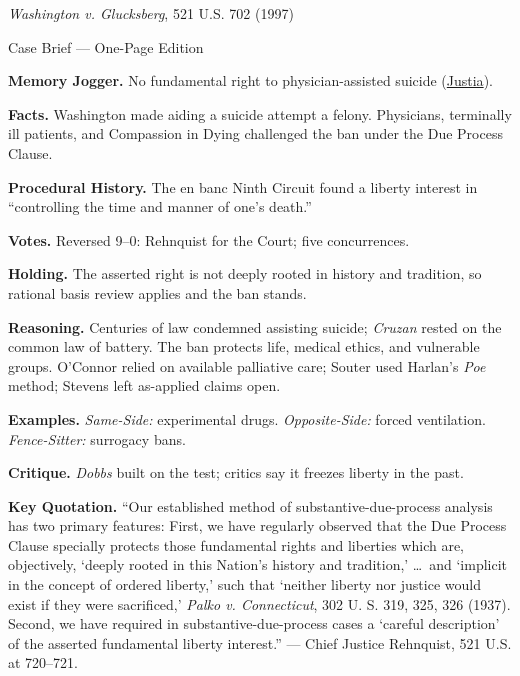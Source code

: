 \documentclass[12pt]{article}
\begin{document}
\begin{center}
{\Large \textit{Washington v. Glucksberg}, 521 U.S. 702 (1997)\par}
\vspace{0.3em}
{\normalsize Case Brief --- One-Page Edition\par}
\end{center}

\textbf{Memory Jogger.} No fundamental right to physician-assisted suicide (\href{https://supreme.justia.com/cases/federal/us/521/702/}{Justia}).

\textbf{Facts.} Washington made aiding a suicide attempt a felony. Physicians, terminally ill patients, and Compassion in Dying challenged the ban under the Due Process Clause.

\textbf{Procedural History.} The en banc Ninth Circuit found a liberty interest in ``controlling the time and manner of one's death.''

\textbf{Votes.} Reversed 9--0: Rehnquist for the Court; five concurrences.

\textbf{Holding.} The asserted right is not deeply rooted in history and tradition, so rational basis review applies and the ban stands.

\textbf{Reasoning.} Centuries of law condemned assisting suicide; \textit{Cruzan} rested on the common law of battery. The ban protects life, medical ethics, and vulnerable groups. O'Connor relied on available palliative care; Souter used Harlan's \textit{Poe} method; Stevens left as-applied claims open.

\textbf{Examples.} \emph{Same-Side:} experimental drugs. \emph{Opposite-Side:} forced ventilation. \emph{Fence-Sitter:} surrogacy bans.

\textbf{Critique.} \textit{Dobbs} built on the test; critics say it freezes liberty in the past.

\textbf{Key Quotation.} ``Our established method of substantive-due-process analysis has two primary features: First, we have regularly observed that the Due Process Clause specially protects those fundamental rights and liberties which are, objectively, `deeply rooted in this Nation's history and tradition,' \ldots\ and `implicit in the concept of ordered liberty,' such that `neither liberty nor justice would exist if they were sacrificed,' \textit{Palko v. Connecticut}, 302 U. S. 319, 325, 326 (1937). Second, we have required in substantive-due-process cases a `careful description' of the asserted fundamental liberty interest.'' --- Chief Justice Rehnquist, 521 U.S. at 720--721.
\end{document}
